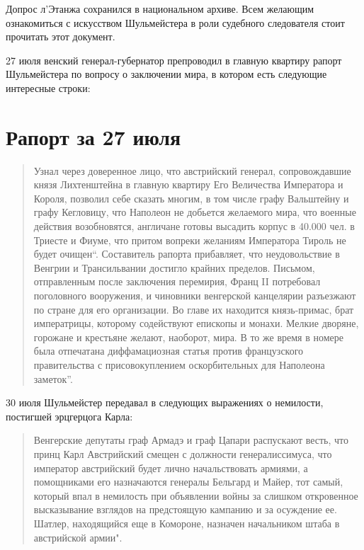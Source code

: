 \documentclass[
  oneside,
  12pt,
  titlepage]{book}
\begin{document}
Допрос л'Этанжа сохранился в национальном архиве. Всем желающим ознакомиться с искусством Шульмейстера в роли судебного следователя стоит прочитать этот документ.

27 июля венский генерал-губернатор препроводил в главную квартиру рапорт Шульмейстера по вопросу о заключении мира, в котором есть следующие интересные строки:

\hypertarget{ux440ux430ux43fux43eux440ux442-ux437ux430-27-ux438ux44eux43bux44f}{%
\section{Рапорт за 27 июля}\label{ux440ux430ux43fux43eux440ux442-ux437ux430-27-ux438ux44eux43bux44f}}

\begin{quote}
Узнал через доверенное лицо, что австрийский генерал, сопровождавшие князя Лихтенштейна в главную квартиру Его Величества Императора и Короля, позволил себе сказать многим, в том числе графу Вальштейну и графу Кегловицу, что Наполеон не добьется желаемого мира, что военные действия возобновятся, англичане готовы высадить корпус в 40.000 чел. в Триесте и Фиуме, что притом вопреки желаниям Императора Тироль не будет очищен``. Составитель рапорта прибавляет, что неудовольствие в Венгрии и Трансильвании достигло крайних пределов. Письмом, отправленным после заключения перемирия, Франц II потребовал поголовного вооружения, и чиновники венгерской канцелярии разъезжают по стране для его организации. Во главе их находится князь-примас, брат императрицы, которому содействуют епископы и монахи. Мелкие дворяне, горожане и крестьяне желают, наоборот, мира. В то же время в номере была отпечатана диффамациозная статья против французского правительства с присовокуплением оскорбительных для Наполеона заметок''.
\end{quote}

30 июля Шульмейстер передавал в следующих выражениях о немилости, постигшей эрцгерцога Карла:

\begin{quote}
Венгерские депутаты граф Армадэ и граф Цапари распускают весть, что принц Карл Австрийский смещен с должности генералиссимуса, что император австрийский будет лично начальствовать армиями, а помощниками его назначаются генералы Бельгард и Майер, тот самый, который впал в немилость при объявлении войны за слишком откровенное высказывание взглядов на предстоящую кампанию и за осуждение ее. Шатлер, находящийся еще в Комороне, назначен начальником штаба в австрийской армии".
\end{quote}
\end{document}
